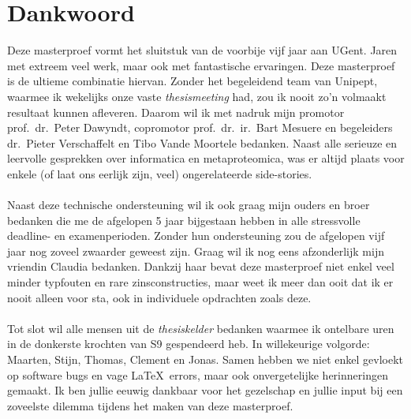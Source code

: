 \chapter*{Dankwoord}\label{ch:dankwoord}
Deze masterproef vormt het sluitstuk van de voorbije vijf jaar aan UGent.
Jaren met extreem veel werk, maar ook met fantastische ervaringen.
Deze masterproef is de ultieme combinatie hiervan.
Zonder het begeleidend team van Unipept, waarmee ik wekelijks onze vaste \textit{thesismeeting} had, zou ik nooit zo'n volmaakt resultaat kunnen afleveren.
Daarom wil ik met nadruk mijn promotor prof.~dr.~Peter Dawyndt, copromotor prof.~dr.~ir.~Bart Mesuere en begeleiders dr.~Pieter Verschaffelt en Tibo Vande Moortele bedanken.
Naast alle serieuze en leervolle gesprekken over informatica en metaproteomica, was er altijd plaats voor enkele (of laat ons eerlijk zijn, veel) ongerelateerde side-stories.
\\ \\
Naast deze technische ondersteuning wil ik ook graag mijn ouders en broer bedanken die me de afgelopen 5 jaar bijgestaan hebben in alle stressvolle deadline- en examenperioden.
Zonder hun ondersteuning zou de afgelopen vijf jaar nog zoveel zwaarder geweest zijn.
Graag wil ik nog eens afzonderlijk mijn vriendin Claudia bedanken.
Dankzij haar bevat deze masterproef niet enkel veel minder typfouten en rare zinsconstructies, maar weet ik meer dan ooit dat ik er nooit alleen voor sta, ook in individuele opdrachten zoals deze.
\\ \\
Tot slot wil alle mensen uit de \textit{thesiskelder} bedanken waarmee ik ontelbare uren in de donkerste krochten van S9 gespendeerd heb.
In willekeurige volgorde: Maarten, Stijn, Thomas, Clement en Jonas.
Samen hebben we niet enkel gevloekt op software bugs en vage \LaTeX\ errors, maar ook onvergetelijke herinneringen gemaakt.
Ik ben jullie eeuwig dankbaar voor het gezelschap en jullie input bij een zoveelste dilemma tijdens het maken van deze masterproef.
